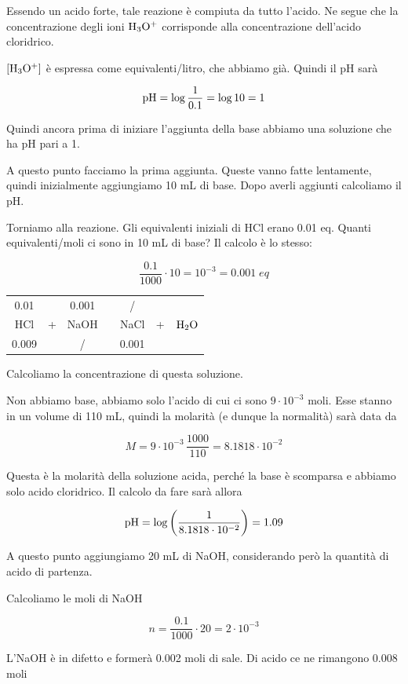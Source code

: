 Essendo un acido forte, tale reazione è compiuta da tutto l'acido. Ne segue che la concentrazione degli ioni $\rm H_3O^+$ corrisponde alla concentrazione dell'acido cloridrico.

$\rm [H_3O^+]$ è espressa come equivalenti/litro, che abbiamo già. Quindi il pH sarà

$$\rm pH=\log\frac{1}{0.1}=\log10=1$$

Quindi ancora prima di iniziare l'aggiunta della base abbiamo una soluzione che ha pH pari a 1.

A questo punto facciamo la prima aggiunta. Queste vanno fatte lentamente, quindi inizialmente aggiungiamo 10 mL di base. Dopo averli aggiunti calcoliamo il pH.

Torniamo alla reazione. Gli equivalenti iniziali di HCl erano 0.01 eq. Quanti equivalenti/moli ci sono in 10 mL di base? Il calcolo è lo stesso:

$$\frac{0.1}{1000} \cdot 10=10^{-3}=0.001 \; eq$$

\begin{center}
    \begin{tabular}{ccccccc}
        0.01 &  & 0.001 & & / & &\\
        HCl & + & NaOH & \ce{->} & NaCl & + & $\rm H_2O$\\
        0.009 &  &  / & & 0.001 & &\\
    \end{tabular}
\end{center}

Calcoliamo la concentrazione di questa soluzione.

Non abbiamo base, abbiamo solo l'acido di cui ci sono $9 \cdot 10^{-3}$ moli. Esse stanno in un volume di 110 mL, quindi la molarità (e dunque la normalità) sarà data da

$$M=9 \cdot 10^{-3} \, \frac{1000}{110}=8.1818 \cdot 10^{-2}$$

Questa è la molarità della soluzione acida, perché la base è scomparsa e abbiamo solo acido cloridrico. Il calcolo da fare sarà allora

$$\rm pH=\log\left( \frac{1}{8.1818 \cdot 10^{-2}} \right)=1.09$$

A questo punto aggiungiamo 20 mL di NaOH, considerando però la quantità di acido di partenza.

Calcoliamo le moli di NaOH

$$n=\frac{0.1}{1000}\cdot 20=2 \cdot 10^{-3}$$

L'NaOH è in difetto e formerà 0.002 moli di sale. Di acido ce ne rimangono 0.008 moli

